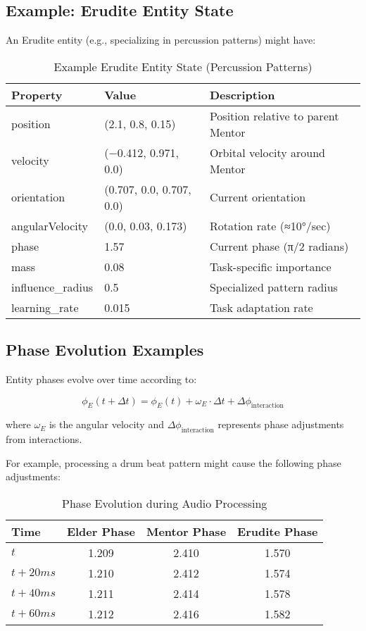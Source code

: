 \subsection{Example: Erudite Entity State}

An Erudite entity (e.g., specializing in percussion patterns) might have:

\begin{table}[h]
\centering
\begin{tabular}{|l|l|l|}
\hline
\textbf{Property} & \textbf{Value} & \textbf{Description} \\
\hline
position & (2.1, 0.8, 0.15) & Position relative to parent Mentor \\
velocity & (−0.412, 0.971, 0.0) & Orbital velocity around Mentor \\
orientation & (0.707, 0.0, 0.707, 0.0) & Current orientation \\
angularVelocity & (0.0, 0.03, 0.173) & Rotation rate (≈10°/sec) \\
phase & 1.57 & Current phase (π/2 radians) \\
mass & 0.08 & Task-specific importance \\
influence\_radius & 0.5 & Specialized pattern radius \\
learning\_rate & 0.015 & Task adaptation rate \\
\hline
\end{tabular}
\caption{Example Erudite Entity State (Percussion Patterns)}
\end{table}

\subsection{Phase Evolution Examples}

Entity phases evolve over time according to:

\begin{equation}
\phi_E(t+\Delta t) = \phi_E(t) + \omega_E \cdot \Delta t + \Delta \phi_{\text{interaction}}
\end{equation}

where $\omega_E$ is the angular velocity and $\Delta \phi_{\text{interaction}}$ represents phase adjustments from interactions.

For example, processing a drum beat pattern might cause the following phase adjustments:

\begin{table}[h]
\centering
\begin{tabular}{|l|c|c|c|}
\hline
\textbf{Time} & \textbf{Elder Phase} & \textbf{Mentor Phase} & \textbf{Erudite Phase} \\
\hline
$t$ & 1.209 & 2.410 & 1.570 \\
$t + 20ms$ & 1.210 & 2.412 & 1.574 \\
$t + 40ms$ & 1.211 & 2.414 & 1.578 \\
$t + 60ms$ & 1.212 & 2.416 & 1.582 \\
\hline
\end{tabular}
\caption{Phase Evolution during Audio Processing}
\end{table}

